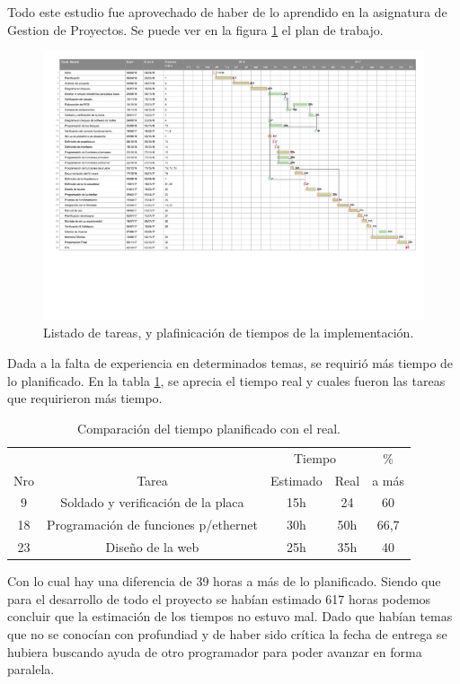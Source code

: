 Todo este estudio fue aprovechado de haber de lo aprendido en la asignatura de Gestion de Proyectos. Se puede ver en la figura \ref{fig:gantt} el plan de trabajo.

\begin{landscape}
  \pagestyle{empty}
  \begin{figure}[htb]
      \centering
          \includegraphics[page=1,clip, trim=0.5cm 5cm 0cm 0cm, width=1.70\textwidth]{./Figures/gantt.pdf}
      \caption{Listado de tareas, y plafinicación de tiempos de la implementación.}
      \label{fig:gantt}
  \end{figure}
\end{landscape}


Dada a la falta de experiencia en determinados temas, se requirió más tiempo de lo planificado.  En la tabla \ref{tab:update_task}, se aprecia el tiempo real y cuales fueron las tareas que requirieron más tiempo.

\begin{table}[hp]
  \begin{tabular}{|c|c|c|c|c|}
    \hline
       &       & \multicolumn{2}{c|}{ Tiempo} & \%  \\ \cline{3-4}
    Nro& Tarea &  Estimado &  Real & a más \\
    \hline
    9 & Soldado y verificación de la placa & 15h & 24 & 60 \\
    18 & Programación de funciones p/ethernet & 30h & 50h & 66,7 \\
    23 & Diseño de la web & 25h & 35h & 40 \\
    \hline \hline
  \end{tabular}
  \caption{Comparación del tiempo planificado con el real.}
  \label{tab:update_task}
\end{table}

Con lo cual hay una diferencia de 39 horas a más de lo planificado. Siendo que para el desarrollo de todo el proyecto se habían estimado 617 horas podemos concluir que la estimación de los tiempos no estuvo mal. 
Dado que habían temas que no se conocían con profundiad y de haber sido crítica la fecha de entrega se hubiera buscando ayuda de otro programador para poder avanzar en forma paralela. 

